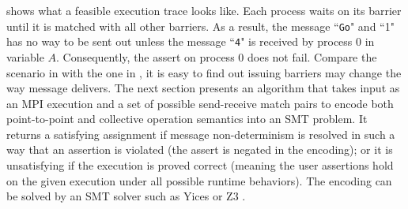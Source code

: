  shows what a feasible execution trace looks like. Each process waits on its barrier until it is matched with all other barriers. As a result, the message ``\texttt{Go}" and ``1" has no way to be sent out unless the message ``\texttt{4}" is received by process $0$ in variable $A$. Consequently, the assert on process $0$ does not fail. Compare the scenario in  with the one in , it is easy to find out issuing barriers may change the way message delivers. The next section presents an algorithm that takes input as an MPI execution and a set of possible send-receive match pairs to encode both point-to-point and collective operation semantics into an SMT problem. It returns a satisfying assignment if message non-determinism is resolved in such a way that an assertion is violated (the assert is negated in the encoding); or it is unsatisfying if the execution is proved correct (meaning the user assertions hold on the given execution under all possible runtime behaviors). The encoding can be solved by an SMT solver such as Yices \cite{} or Z3 \cite{}.





